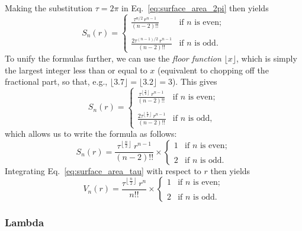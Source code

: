 Making the substitution $\tau=2\pi$ in Eq.~\eqref{eq:surface_area_2pi} then yields
\[
S_n(r) = \begin{cases}
\displaystyle \frac{\tau^{n/2}\,r^{n-1}}{(n-2)!!} & \text{if } n \text{ is even}; \\ \\
\displaystyle \frac{2\tau^{(n-1)/2}\,r^{n-1}}{(n-2)!!} & \text{if } n \text{ is odd.}
\end{cases} \]
To unify the formulas further, we can use the \emph{floor function} $\lfloor x \rfloor$, which is simply the largest integer less than or equal to $x$ (equivalent to chopping off the fractional part, so that, e.g., $\lfloor 3.7 \rfloor = \lfloor 3.2 \rfloor = 3$). This gives
\[ S_n(r) = \begin{cases}
 \displaystyle \frac{\tau^{\left\lfloor \frac{n}{2} \right\rfloor}\,r^{n-1}}{(n-2)!!} & \text{if } n \text{ is even}; \\ \\
 \displaystyle \frac{2\tau^{\left\lfloor \frac{n}{2} \right\rfloor}\,r^{n-1}}{(n-2)!!} & \text{if } n \text{ is odd},
 \end{cases} \]
which allows us to write the formula as follows:
\begin{equation}
\label{eq:surface_area_tau}
S_n(r) = \frac{\tau^{\left\lfloor \frac{n}{2} \right\rfloor}\,r^{n-1}}{(n-2)!!}\times \begin{cases}
1 & \text{if } n \text{ is even}; \\ \\
2 & \text{if } n \text{ is odd}.
\end{cases}
\end{equation}
Integrating Eq.~\eqref{eq:surface_area_tau} with respect to $r$ then yields
\begin{equation}
\label{eq:volume_tau}
V_n(r) = \frac{\tau^{\left\lfloor \frac{n}{2} \right\rfloor}\,r^n}{n!!}\times \begin{cases}
1 & \text{if } n \text{ is even}; \\ \\
2 & \text{if } n \text{ is odd}.
\end{cases}
\end{equation}

\subsubsection{Lambda} %
\label{sec:lambda}

